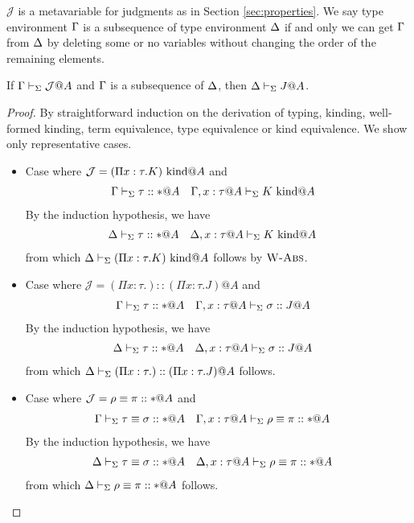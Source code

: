 $\mathcal{J}$ is a metavariable for judgments as in Section \ref{sec:properties}.
We say type environment \(\Gamma\) is a subsequence of type environment \(\Delta\)
if and only we can get \(\Gamma\) from \(\Delta\) by deleting some or no variables without changing the order of the remaining elements.
\begin{lemma}[Weakening]
	If \(\Gamma \vdash_\Sigma \mathcal{J}@A\) and \(\Gamma\) is a subsequence of \(\Delta\), then \(\Delta \vdash_\Sigma J@A\). 
\end{lemma}

\begin{proof}
	By straightforward induction on the derivation of typing, kinding, well-formed kinding,
	term equivalence, type equivalence or kind equivalence.
	We show only representative cases.
	\begin{itemize}
		\item[] Case \WAbs{} where $\mathcal{J} = (\Pi x:\tau.K)\text{\ kind} @A$ and 
		\begin{align*} 
			& \G \V \tau :: * @ A && \G,x:\tau@A \V K \iskind @A
		\end{align*}
		By the induction hypothesis, we have
		\begin{align*}
			& \D \V \tau::*@A && \D, x:\tau@A \V K \iskind @ A
		\end{align*}
		from which $\Delta\vdash_\Sigma (\Pi x:\tau.K) \text{\ kind} @ A$ follows by $\textsc{W-Abs}$.

		\item[] Case \KAbs{} where $\mathcal{J} = (\Pi x:\tau.) :: (\Pi x:\tau.J)@A$ and 
		\begin{align*} 
			& \G \V \tau::*@A && \G,x:\tau@A\V \sigma :: J @ A
		\end{align*}
		By the induction hypothesis, we have
		\begin{align*} 
			& \D \V \tau::*@A && \D,x:\tau@A\V \sigma :: J @ A
		\end{align*}
		from which $\Delta \vdash_\Sigma (\Pi x:\tau.) :: (\Pi x:\tau.J)@A$ follows.

		\item[] Case \QTAbs{} where \( \mathcal{J} = \rho \equiv \pi :: * @ A \) and
		\begin{align*} 
			& \G\V \tau \E \sigma :: *@A && \G,x:\tau@A \V \rho \E \pi :: *@A
		\end{align*}
		By the induction hypothesis, we have
		\begin{align*} 
			& \D\V \tau \E \sigma :: *@A && \D,x:\tau@A \V \rho \E \pi :: *@A
		\end{align*}
		from which \( \Delta\vdash_\Sigma \rho \equiv \pi :: * @ A \) follows.

	\end{itemize}
\end{proof}

